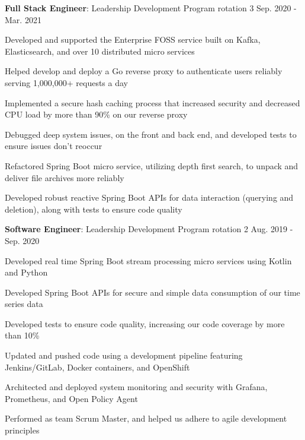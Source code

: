 \begin{cventries}
\vspace{-1.25em}
\cventry
{\textbf{Full Stack Engineer}: Leadership Development Program rotation 3} %
{} %
{} %
{Sep. 2020 - Mar. 2021} %
{ %
\begin{cvitems}
\item {Developed and supported the Enterprise FOSS service built on Kafka, Elasticsearch, and over 10 distributed micro services}
\item {Helped develop and deploy a Go reverse proxy to authenticate users reliably serving 1,000,000+ requests a day}
\item {Implemented a secure hash caching process that increased security and decreased CPU load by more than 90\% on our reverse proxy}
\item {Debugged deep system issues, on the front and back end, and developed tests to ensure issues don't reoccur}
\item {Refactored Spring Boot micro service, utilizing depth first search, to unpack and deliver file archives more reliably}
\item {Developed robust reactive Spring Boot APIs for data interaction (querying and deletion), along with tests to ensure code quality}
\end{cvitems}
}


\vspace{-1.25em}
\cventry
{\textbf{Software Engineer}: Leadership Development Program rotation 2} %
{} %
{} %
{Aug. 2019 - Sep. 2020} %
{ %
\begin{cvitems}
\item {Developed real time Spring Boot stream processing micro services using Kotlin and Python}
\item {Developed Spring Boot APIs for secure and simple data consumption of our time series data}
\item {Developed tests to ensure code quality, increasing our code coverage by more than 10\%}
\item {Updated and pushed code using a development pipeline featuring Jenkins/GitLab, Docker containers, and OpenShift}
\item {Architected and deployed system monitoring and security with Grafana, Prometheus, and Open Policy Agent}
\item {Performed as team Scrum Master, and helped us adhere to agile development principles}
\end{cvitems}
}


\end{cventries}
